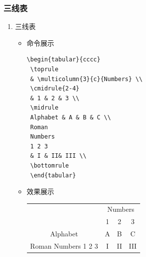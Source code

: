\documentclass[UTF8]{ctexart}
\begin{document}
\subsubsection{三线表}
\begin{enumerate}
  \item 三线表
   \begin{itemize}
      \item 命令展示
\begin{lstlisting}
\begin{tabular}{cccc}
 \toprule
 & \multicolumn{3}{c}{Numbers} \\
 \cmidrule{2-4}
 & 1 & 2 & 3 \\
 \midrule
 Alphabet & A & B & C \\
 Roman
 Numbers
 1 2 3
 & I & II& III \\
 \bottomrule
 \end{tabular}
\end{lstlisting}
\item 效果展示
\begin{tabular}{cccc}
 \toprule
 & \multicolumn{3}{c}{Numbers} \\
 \cmidrule{2-4}
 & 1 & 2 & 3 \\
 \midrule
 Alphabet & A & B & C \\
 Roman
 Numbers
 1 2 3
 & I & II& III \\
 \bottomrule
 \end{tabular}
\end{itemize}
\end{enumerate}
\end{document}
